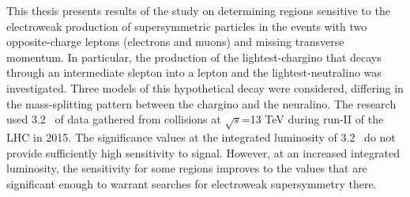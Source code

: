 This thesis presents results of the study on determining regions sensitive to the electroweak production of supersymmetric particles in the events with two opposite-charge leptons (electrons and muons) and missing transverse momentum. 
In particular, the production of the lightest-chargino that decays through an intermediate slepton into a lepton and the lightest-neutralino was investigated.
Three models of this hypothetical decay were considered, differing in the mass-splitting pattern between the chargino and the neuralino. The research used 3.2 \invfb \, of data gathered from collisions at $\sqrt{s}$=13 TeV during run-II of the LHC in 2015. The significance values at the integrated luminosity of 3.2 \invfb \, do not provide sufficiently high sensitivity to signal. However, at an increased integrated luminosity, the sensitivity for some regions improves to the values that are significant enough to warrant searches for electroweak supersymmetry there.
